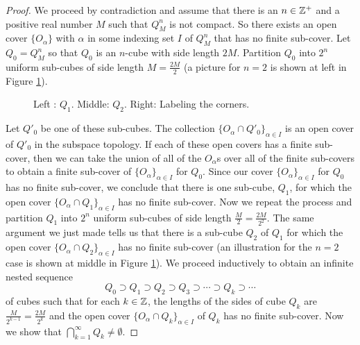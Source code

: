 \begin{proof} We proceed by contradiction and assume that there is an $n \in \mathbb{Z}^+$ and a positive real number $M$ such that $Q^n_M$ is not compact. So there exists an open cover $\{O_{\alpha}\}$ with $\alpha$ in some indexing set $I$ of $Q^n_M$ that has no finite sub-cover. Let $Q_0 =  Q^n_M$ so that $Q_0$ is an $n$-cube with side length $2M$. Partition $Q_0$ into $2^n$ uniform sub-cubes of side length $M = \frac{2M}{2}$ (a picture for $n=2$ is shown at left in Figure \ref{F:Cubes}). 
\begin{figure}[t]
\begin{center}
 \hspace{0.5in}  \hspace{0.5in}  
\end{center}
\caption{Left : $Q_1$. Middle: $Q_2$. Right: Labeling the corners.}
\label{F:Cubes}
\end{figure}
Let $Q'_0$ be one of these sub-cubes. The collection $\{O_{\alpha} \cap Q'_0\}_{\alpha \in I}$ is an open cover of $Q'_0$ in the subspace topology. If each of these open covers has a finite sub-cover, then we can take the union of all of the $O_{\alpha}$s over all of the finite sub-covers to obtain a finite sub-cover of $\{O_{\alpha}\}_{\alpha \in I}$ for $Q_0$. Since our cover $\{O_{\alpha}\}_{\alpha \in I}$ for $Q_0$ has no finite sub-cover, we conclude that there is one sub-cube, $Q_1$, for which the open cover $\{O_{\alpha} \cap Q_1\}_{\alpha \in I}$ has no finite sub-cover. Now we repeat the process and partition $Q_1$ into $2^n$ uniform sub-cubes of side length $\frac{M}{2}= \frac{2M}{2^2}$. The same argument we just made tells us that there is a sub-cube $Q_2$ of $Q_1$ for which the open cover  $\{O_{\alpha} \cap Q_2\}_{\alpha \in I}$ has no finite sub-cover (an illustration for the $n=2$ case is shown at middle in Figure \ref{F:Cubes}). We proceed inductively to obtain an infinite nested sequence 
\[Q_0 \supset Q_1 \supset Q_2 \supset Q_3 \supset \cdots \supset Q_k \supset \cdots \]
of cubes such that for each $k \in \mathbb{Z}$, the lengths of the sides of cube $Q_k$ are $\frac{M}{2^{k-1}} = \frac{2M}{2^{k}}$ and the open cover $\{O_{\alpha} \cap Q_k\}_{\alpha \in I}$ of $Q_k$ has no finite sub-cover. Now we show that $\bigcap_{k=1}^{\infty} Q_k \neq \emptyset$.


\end{proof}
